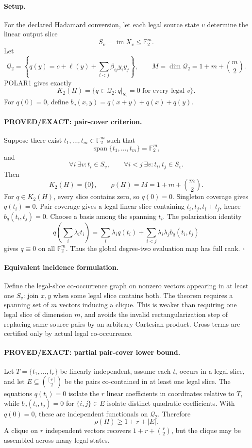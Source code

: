 \documentclass[11pt]{article}
\begin{document}
\paragraph{Setup.}
For the declared Hadamard conversion, let each legal source state \(v\) determine the linear output slice
\[
S_v=\operatorname{im}X_v\le \mathbb F_2^m.
\]
Let
\[
\mathcal Q_2=\left\{q(y)=c+\ell(y)+\sum_{i<j}\beta_{ij}y_i y_j\right\},
\qquad M=\dim\mathcal Q_2=1+m+\binom m2.
\]
POLAR1 gives exactly
\[
K_2(H)=\{q\in\mathcal Q_2:q|_{S_v}=0\text{ for every legal }v\}.
\]
For \(q(0)=0\), define \(b_q(x,y)=q(x+y)+q(x)+q(y)\).

\paragraph{PROVED/EXACT: pair-cover criterion.}
Suppose there exist \(t_1,\ldots,t_m\in\mathbb F_2^m\) such that
\[
\operatorname{span}\{t_1,\ldots,t_m\}=\mathbb F_2^m,
\]
and
\[
\forall i\ \exists v: t_i\in S_v,
\qquad \forall i<j\ \exists v: t_i,t_j\in S_v.
\]
Then
\[
\boxed{K_2(H)=\{0\}},\qquad
\boxed{\rho(H)=M=1+m+\binom m2}.
\]
For \(q\in K_2(H)\), every slice contains zero, so \(q(0)=0\). Singleton coverage gives \(q(t_i)=0\). Pair coverage gives a legal linear slice containing \(t_i,t_j,t_i+t_j\), hence \(b_q(t_i,t_j)=0\). Choose a basis among the spanning \(t_i\). The polarization identity
\[
q\!\left(\sum_i\lambda_i t_i\right)=
\sum_i\lambda_i q(t_i)+
\sum_{i<j}\lambda_i\lambda_j b_q(t_i,t_j)
\]
gives \(q\equiv0\) on all \(\mathbb F_2^m\). Thus the global degree-two evaluation map has full rank. \(\square\)

\paragraph{Equivalent incidence formulation.}
Define the legal-slice co-occurrence graph on nonzero vectors appearing in at least one \(S_v\): join \(x,y\) when some legal slice contains both. The theorem requires a spanning set of \(m\) vectors inducing a clique. This is weaker than requiring one legal slice of dimension \(m\), and avoids the invalid rectangularization step of replacing same-source pairs by an arbitrary Cartesian product. Cross terms are certified only by actual legal co-occurrence.

\paragraph{PROVED/EXACT: partial pair-cover lower bound.}
Let \(T=\{t_1,\ldots,t_r\}\) be linearly independent, assume each \(t_i\) occurs in a legal slice, and let \(E\subseteq\binom{[r]}2\) be the pairs co-contained in at least one legal slice. The equations \(q(t_i)=0\) isolate the \(r\) linear coefficients in coordinates relative to \(T\), while \(b_q(t_i,t_j)=0\) for \(\{i,j\}\in E\) isolate distinct quadratic coefficients. With \(q(0)=0\), these are independent functionals on \(\mathcal Q_2\). Therefore
\[
\boxed{\rho(H)\ge 1+r+|E|}.
\]
A clique on \(r\) independent vectors recovers \(1+r+\binom r2\), but the clique may be assembled across many legal states.
\end{document}
